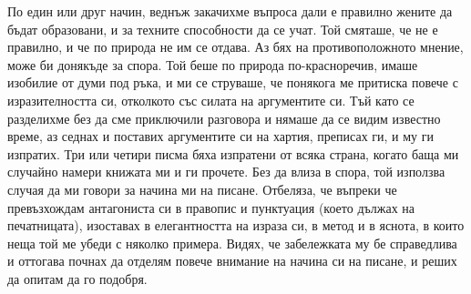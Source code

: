 \documentclass[12pt]{book}
\begin{document}
По един или друг начин, веднъж закачихме въпроса дали е правилно жените да бъдат образовани, и за техните способности да се учат. Той смяташе, че не е правилно, и че по природа не им се отдава. Аз бях на противоположното мнение, може би донякъде за спора. Той беше по природа по-красноречив, имаше изобилие от думи под ръка, и ми се струваше, че понякога ме притиска повече с изразителността си, отколкото със силата на аргументите си. Тъй като се разделихме без да сме приключили разговора и нямаше да се видим известно време, аз седнах и поставих аргументите си на хартия, преписах ги, и му ги изпратих. Три или четири писма бяха изпратени от всяка страна, когато баща ми случайно намери книжата ми и ги прочете. Без да влиза в спора, той използва случая да ми говори за начина ми на писане. Отбеляза, че въпреки че превъзхождам антагониста си в правопис и пунктуация (което дължах на печатницата), изоставах в елегантността на израза си, в метод и в яснота, в които неща той ме убеди с няколко примера. Видях, че забележката му бе справедлива  и оттогава почнах да отделям повече внимание на начина си на писане, и реших да опитам да го подобря.
\end{document}
